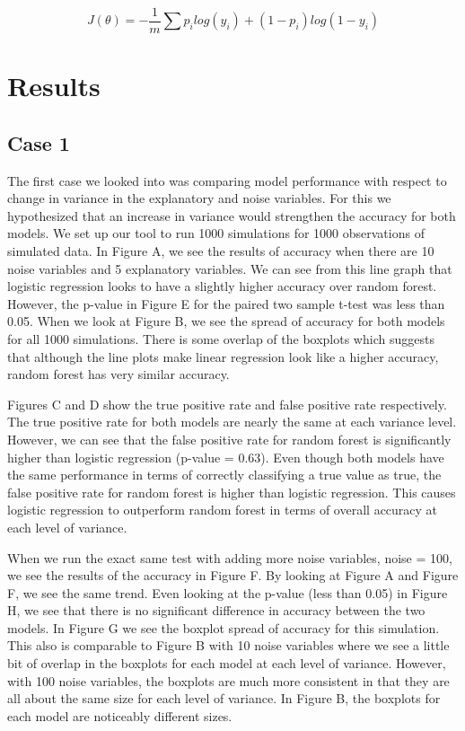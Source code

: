 \documentclass{llncs}
\begin{document}
\begin{equation}
J(\theta) = -\frac{1}{m}\sum p_{i}log(y_{i}) + (1-p_{i})log(1-y_{i})
\end{equation}



\section{Results}

\subsection{Case 1}

The first case we looked into was comparing model performance with respect to change in variance in the explanatory and noise variables.  For this we hypothesized that an increase in variance would strengthen the accuracy for both models.  We set up our tool to run 1000 simulations for 1000 observations of simulated data.  In Figure A, we see the results of accuracy when there are 10 noise variables and 5 explanatory variables.  We can see from this line graph that logistic regression looks to have a slightly higher accuracy over random forest.  However, the p-value in Figure E for the paired two sample t-test was less than 0.05.  When we look at Figure B, we see the spread of accuracy for both models for all 1000 simulations.  There is some overlap of the boxplots which suggests that although the line plots make linear regression look like a higher accuracy, random forest has very similar accuracy.

Figures C and D show the true positive rate and false positive rate respectively.  The true positive rate for both models are nearly the same at each variance level.  However, we can see that the false positive rate for random forest is significantly higher than logistic regression (p-value = 0.63).  Even though both models have the same performance in terms of correctly classifying a true value as true, the false positive rate for random forest is higher than logistic regression.  This causes logistic regression to outperform random forest in terms of overall accuracy at each level of variance.

When we run the exact same test with adding more noise variables, noise = 100, we see the results of the accuracy in Figure F.  By looking at Figure A and Figure F, we see the same trend.  Even looking at the p-value (less than 0.05) in Figure H, we see that there is no significant difference in accuracy between the two models.  In Figure G we see the boxplot spread of accuracy for this simulation.  This also is comparable to Figure B with 10 noise variables where we see a little bit of overlap in the boxplots for each model at each level of variance.  However, with 100 noise variables, the boxplots are much more consistent in that they are all about the same size for each level of variance.  In Figure B, the boxplots for each model are noticeably different sizes.
\end{document}
